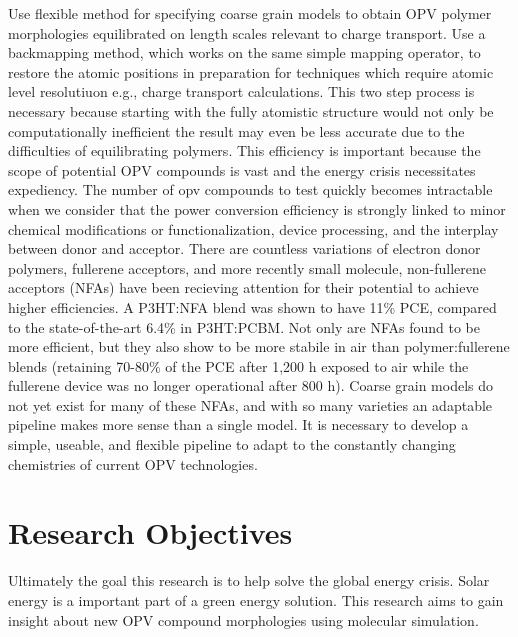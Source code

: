 Use flexible method for specifying coarse grain models to obtain OPV polymer morphologies equilibrated on length scales relevant to charge transport.
Use a backmapping method, which works on the same simple mapping operator, to restore the atomic positions in preparation for techniques which require atomic level resolutiuon e.g., charge transport calculations.
This two step process is necessary because starting with the fully atomistic structure would not only be computationally inefficient the result may even be less accurate due to the difficulties of equilibrating polymers\cite{Gartner2019a}.
This efficiency is important because the scope of potential OPV compounds is vast and the energy crisis necessitates expediency.
The number of opv compounds to test quickly becomes intractable when we consider that the power conversion efficiency is strongly linked to minor chemical modifications or functionalization, device processing, and the interplay between donor and acceptor\cite{Mazzio2015,Swick2019a}.
There are countless variations of electron donor polymers, fullerene acceptors, and more recently small molecule, non-fullerene acceptors (NFAs) have been recieving attention for their potential to achieve higher efficiencies\cite{Dou2013}.
A P3HT:NFA blend was shown to have 11\% PCE, compared to the state-of-the-art 6.4\% in P3HT:PCBM\cite{Baran2017}.
Not only are NFAs found to be more efficient, but they also show to be more stabile in air than polymer:fullerene blends (retaining 70-80\% of the PCE after 1,200 h exposed to air while the fullerene device was no longer operational after 800 h)\cite{Baran2017}.
Coarse grain models do not yet exist for many of these NFAs, and with so many varieties an adaptable pipeline makes more sense than a single model.%
It is necessary to develop a simple, useable, and flexible pipeline to adapt to the constantly changing chemistries of current OPV technologies. %

\section*{Research Objectives}

Ultimately the goal this research is to help solve the global energy crisis. 
Solar energy is a important part of a green energy solution.
This research aims to gain insight about new OPV compound morphologies using molecular simulation.

